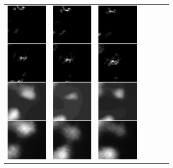 \begin{figure}[h]
\begin{tabular}{lllllll}
\includegraphics[width=20mm]{abb/prediction/280_maxCont}&
\includegraphics[width=20mm]{abb/prediction/281_maxCont}&
\includegraphics[width=20mm]{abb/prediction/282_maxCont}&

\end{tabular}
\end{figure}
